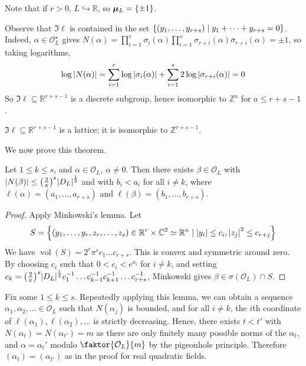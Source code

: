 Note that if \( r > 0 \), \( L \hookrightarrow \mathbb R \), so \( \bm\mu_L = \qty{\pm 1} \).

Observe that \( \Im \ell \) is contained in the set \( \qty{(y_1, \dots, y_{r+s}) \mid y_1 + \dots + y_{r+s} = 0} \).
Indeed, \( \alpha \in \mathcal O_L^\star \) gives \( N(\alpha) = \prod_{i=1}^r \sigma_i(\alpha) \prod_{i=1}^s \sigma_{r+i}(\alpha) \overline\sigma_{r+i}(\alpha) = \pm 1 \), so taking logarithms,
\[ \log\abs{N(\alpha)} = \sum_{i=1}^r \log\abs{\sigma_i(\alpha)} + \sum_{i=1}^s 2\log\abs{\sigma_{r+i}(\alpha)} = 0 \]
So \( \Im \ell \subseteq \mathbb R^{r+s-1} \) is a discrete subgroup, hence isomorphic to \( \mathbb Z^a \) for \( a \leq r + s - 1 \).
\begin{theorem}
    \( \Im \ell \subseteq \mathbb R^{r+s-1} \) is a lattice; it is isomorphic to \( \mathbb Z^{r+s-1} \).
\end{theorem}
We now prove this theorem.
\begin{lemma}
    Let \( 1 \leq k \leq s \), and \( \alpha \in \mathcal O_L \), \( \alpha \neq 0 \).
    Then there exists \( \beta \in \mathcal O_L \) with \( \abs{N(\beta)} \leq \qty(\frac{2}{\pi})^s \abs{D_L}^{\frac{1}{2}} \) and with \( b_i < a_i \) for all \( i \neq k \), where \( \ell(\alpha) = (a_1, \dots, a_{r+s}) \) and \( \ell(\beta) = (b_1, \dots, b_{r+s}) \).
\end{lemma}
\begin{proof}
    Apply Minkowski's lemma.
    Let
    \[ S = \qty{(y_1, \dots, y_r, z_r, \dots, z_s) \in \mathbb R^r \times \mathbb C^2 \simeq \mathbb R^n \mid \abs{y_i} \leq c_i, \abs{z_j}^2 \leq c_{r+j}} \]
    We have \( \operatorname{vol}(S) = 2^r \pi^s c_1 \dots c_{r+s} \).
    This is convex and symmetric around zero.
    By choosing \( c_i \) such that \( 0 < c_i < e^{a_i} \) for \( i \neq k \), and setting \( c_k = \qty(\frac{2}{\pi})^s \abs{D_L}^{\frac{1}{2}} c_1^{-1} \dots c_{k-1}^{-1} c_{k+1}^{-1} \dots c_{r+s}^{-1} \), Minkowski gives \( \beta \in \sigma(\mathcal O_L) \cap S \).
\end{proof}
Fix some \( 1 \leq k \leq s \).
Repeatedly applying this lemma, we can obtain a sequence \( \alpha_1, \alpha_2, \dots \in \mathcal O_L \) such that \( N(\alpha_j) \) is bounded, and for all \( i \neq k \), the \( i \)th coordinate of \( \ell(\alpha_1), \ell(\alpha_2), \dots \) is strictly decreasing.
Hence, there exists \( t < t' \) with \( N(\alpha_t) = N(\alpha_{t'}) = m \) as there are only finitely many possible norms of the \( \alpha_t \), and \( \alpha = \alpha_t' \) modulo \( \faktor{\mathcal O_L}{m} \) by the pigeonhole principle.
Therefore \( (\alpha_t) = (\alpha_{t'}) \) as in the proof for real quadratic fields.

